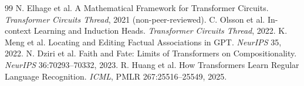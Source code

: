 \documentclass[10pt]{article}
\begin{document}
\begin{sloppypar}
\begin{thebibliography}{99}
 N. Elhage et al. A Mathematical Framework for Transformer Circuits. \emph{Transformer Circuits Thread}, 2021 (non-peer-reviewed).
 C. Olsson et al. In-context Learning and Induction Heads. \emph{Transformer Circuits Thread}, 2022.
 K. Meng et al. Locating and Editing Factual Associations in GPT. \emph{NeurIPS} 35, 2022.
 N. Dziri et al. Faith and Fate: Limits of Transformers on Compositionality. \emph{NeurIPS} 36:70293--70332, 2023.
 R. Huang et al. How Transformers Learn Regular Language Recognition. \emph{ICML}, PMLR 267:25516--25549, 2025.
\end{thebibliography}\end{sloppypar}
\end{document}
